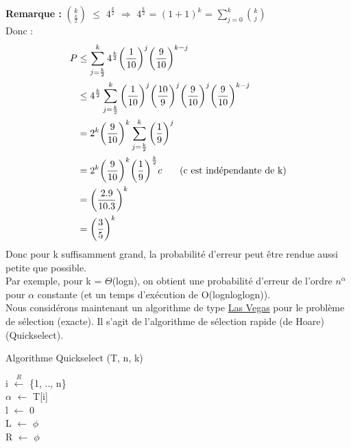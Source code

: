 \documentclass[12pt,a4paper]{article}
\newcommand\tab[1][0.65cm]{\hspace*{#1}}
\begin{document}
\textbf{Remarque :} $\binom{k}{\frac{k}{2}}$ $\leq$ $4^{\frac{k}{2}}$ $\Rightarrow$ $4^{\frac{k}{2}}$ = $(1 + 1)^k$ = $\sum\limits_{j = 0}^{k} \binom{k}{j}$\\
Donc :
\begin{equation} 
\begin{split}\nonumber
P &\leq \sum\limits_{j = \frac{k}{2}}^{k} 4^{\frac{k}{2}} {\bigg(\dfrac{1}{10}\bigg)}^j {\bigg(\dfrac{9}{10}\bigg)}^{k - j}\\
&\leq 4^{\frac{k}{2}} \sum\limits_{j = \frac{k}{2}}^{k} {\bigg(\dfrac{1}{10}\bigg)}^j {\bigg(\dfrac{10}{9}\bigg)}^j {\bigg(\dfrac{9}{10}\bigg)}^j {\bigg(\dfrac{9}{10}\bigg)}^{k - j}\\
&= 2^k {\bigg(\dfrac{9}{10}\bigg)}^k \sum\limits_{j = \frac{k}{2}}^{k} {\bigg(\dfrac{1}{9}\bigg)}^j\\
&= 2^k {\bigg(\dfrac{9}{10}\bigg)}^k {\bigg(\dfrac{1}{9}\bigg)}^{\frac{k}{2}} c \tab \text{(c est indépendante de k)}\\
&= {\bigg(\dfrac{2 . 9}{10 . 3}\bigg)}^k\\
&= {\bigg(\dfrac{3}{5}\bigg)}^k
\end{split}
\end{equation}
Donc pour k suffisamment grand, la probabilité d'erreur peut être rendue aussi petite que possible.\\
Par exemple, pour k = $\Theta$(logn), on obtient une probabilité d'erreur de l'ordre $n^\alpha$ pour $\alpha$ constante (et un temps d'exécution de O(lognloglogn)).\\
Nous considérons maintenant un algorithme de type \underline{Las Vegas} pour le problème de sélection (exacte). Il s'agit de l'algorithme de sélection rapide (de Hoare) (Quickselect).\\
\begin{algorithm}[H]
	\caption{Algorithme Quickselect (T, n, k)}
	i $\xleftarrow{R}$ \{1, .., n\}\\
	$\alpha$ $\gets$ T[i]  \text{\tab // $\alpha$ est le pivot}\\
	l $\gets$ 0\\
	L $\gets$ $\phi$\\
	R $\gets$ $\phi$\\
\end{algorithm}
\end{document}

